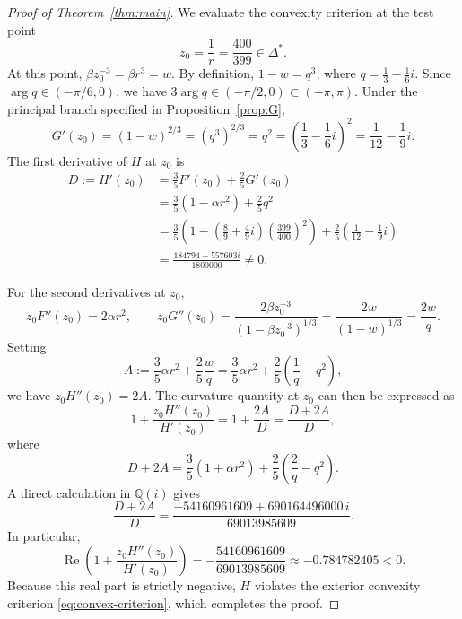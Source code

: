 \documentclass[11pt,reqno]{amsart}
\theoremstyle{definition}
\renewcommand{\Re}{\operatorname{Re}}
\begin{document}
\begin{proof}[Proof of Theorem~\ref{thm:main}]
We evaluate the convexity criterion at the test point
\begin{equation}
z_0 = \frac{1}{r} = \frac{400}{399} \in \Delta^*.
\end{equation}
At this point, $\beta z_0^{-3} = \beta r^3 = w$. By definition, $1 - w = q^3$, where $q = \frac{1}{3} - \frac{1}{6}i$. Since $\arg q \in (-\pi/6, 0)$, we have $3\arg q \in (-\pi/2, 0) \subset (-\pi, \pi)$. Under the principal branch specified in Proposition~\ref{prop:G},
\begin{equation}
G'(z_0) = (1 - w)^{2/3} = (q^3)^{2/3} = q^2 = \left(\frac{1}{3} - \frac{1}{6}i\right)^2 = \frac{1}{12} - \frac{1}{9}i.
\end{equation}
The first derivative of $H$ at $z_0$ is
\begin{align}
D := H'(z_0) &= \frac{3}{5} F'(z_0) + \frac{2}{5} G'(z_0) \nonumber\\
&= \frac{3}{5}(1 - \alpha r^2) + \frac{2}{5} q^2 \nonumber\\
&= \frac{3}{5}\left(1 - \left(\frac{8}{9} + \frac{4}{9}i\right)\left(\frac{399}{400}\right)^2\right) + \frac{2}{5}\left(\frac{1}{12} - \frac{1}{9}i\right) \nonumber\\
&= \frac{184794 - 557603i}{1800000} \neq 0.
\end{align}

For the second derivatives at $z_0$,
\begin{equation}
z_0 F''(z_0) = 2\alpha r^2, \qquad z_0 G''(z_0) = \frac{2\beta z_0^{-3}}{(1 - \beta z_0^{-3})^{1/3}} = \frac{2w}{(1 - w)^{1/3}} = \frac{2w}{q}.
\end{equation}
Setting
\begin{equation}
A := \frac{3}{5}\alpha r^2 + \frac{2}{5}\frac{w}{q} = \frac{3}{5}\alpha r^2 + \frac{2}{5}\left(\frac{1}{q} - q^2\right),
\end{equation}
we have $z_0 H''(z_0) = 2A$. The curvature quantity at $z_0$ can then be expressed as
\begin{equation}
1 + \frac{z_0 H''(z_0)}{H'(z_0)} = 1 + \frac{2A}{D} = \frac{D + 2A}{D},
\end{equation}
where
\begin{equation}
D + 2A = \frac{3}{5}(1 + \alpha r^2) + \frac{2}{5}\left(\frac{2}{q} - q^2\right).
\end{equation}
A direct calculation in $\mathbb{Q}(i)$ gives
\begin{equation}
\frac{D + 2A}{D} = \frac{-54160961609 + 690164496000\,i}{69013985609}.
\end{equation}
In particular,
\begin{equation}
\Re\left(1 + \frac{z_0 H''(z_0)}{H'(z_0)}\right) = -\frac{54160961609}{69013985609} \approx -0.784782405 < 0.
\end{equation}
Because this real part is strictly negative, $H$ violates the exterior convexity criterion \eqref{eq:convex-criterion}, which completes the proof.
\end{proof}
\end{document}
